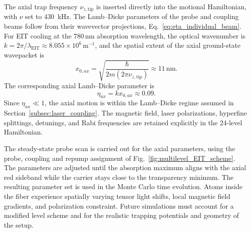 The axial trap frequency $\nu_{z,\mathrm{tip}}$ is inserted directly into the motional Hamiltonian, with $\nu$ set to $430$~kHz. The Lamb--Dicke parameters of the probe and coupling beams follow from their wavevector projections, Eq.~\eqref{eq:eta_individual_beam}. For EIT cooling at the $780\,\mathrm{nm}$ absorption wavelength, the optical wavenumber is $k = 2\pi/\lambda_{\mathrm{EIT}} \approx 8.055 \times 10^6\,\mathrm{m}^{-1}$, and the spatial extent of the axial ground-state wavepacket is
\begin{equation}
x_{0,ax} = \sqrt{\frac{\hbar}{2m(2\pi\nu_{z,\mathrm{tip}})}} \approx 11\,\mathrm{nm}.
\end{equation}
The corresponding axial Lamb--Dicke parameter is
\begin{equation}
\eta_{ax} = k x_{0,ax} \approx 0.09.
\end{equation}
Since $\eta_{ax} \ll 1$, the axial motion is within the Lamb--Dicke regime assumed in Section~\ref{subsec:laser_coupling}. The magnetic field, laser polarizations, hyperfine splittings, detunings, and Rabi frequencies are retained explicitly in the 24-level Hamiltonian.

The steady-state probe scan is carried out for the axial parameters, using the probe, coupling and repump assignment of Fig.~\ref{fig:multilevel_EIT_scheme}. The parameters are adjusted until the absorption maximum aligns with the axial red sideband while the carrier stays close to the transparency minimum. The resulting parameter set is used in the Monte Carlo time evolution. Atoms inside the fiber experience spatially varying tensor light shifts, local magnetic field gradients, and polarization constraint. Future simulations must account for a modified level scheme and for the realistic trapping potentials and geometry of the setup.